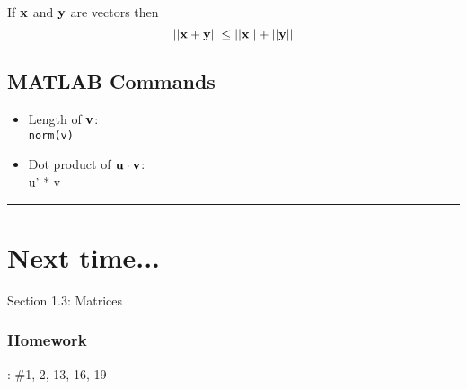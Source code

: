 \begin{tcolorbox}[colback=yellow!10!,colframe=gray!15!]
\begin{theorem}
If ${\bf x} $ and ${\bf y} $ are vectors  then
 \[ ||  {\bf x}  +  {\bf y} || \le ||{\bf x}||  +   ||{\bf y}|| \]
 \end{theorem}	 
\end{tcolorbox} 






\subsection*{MATLAB Commands}
\begin{itemize}
	\item Length of ${\bf v}$:  \\ 
	\texttt{norm(v)}
	\item Dot product of ${\bf u} \cdot {\bf v}$: \\
	\textsf{u' * v} 
\end{itemize}




\rule[0.01in]{\textwidth}{0.0025in}




\section*{Next time...}
Section 1.3: Matrices





\subsubsection*{Homework}
: \#1, 2, 13, 16, 19


